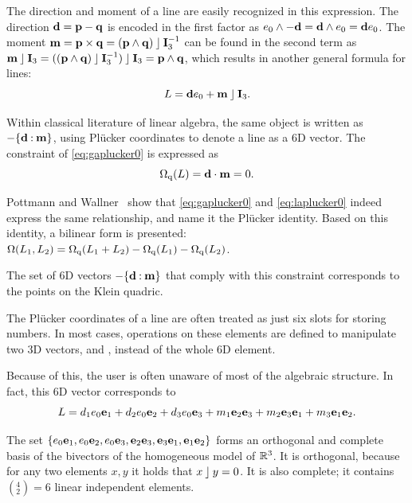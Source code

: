 The direction and moment of a line are easily recognized in this expression.  The direction $\mathbf{d} = \mathbf{p} - \mathbf{q}$ is encoded in the first factor as $e_0 \wedge -\mathbf{d} = \mathbf{d} \wedge e_0 = \mathbf{d} e_0$.  
The moment $\mathbf{m} = \mathbf{p} \times \mathbf{q} = (\mathbf{p} \wedge \mathbf{q}) \mathbin{\rfloor} \mathbf{I}_3^{-1}$ can be found in the second term as $\mathbf{m} \mathbin{\rfloor} \mathbf{I}_3 = ((\mathbf{p} \wedge \mathbf{q}) \mathbin{\rfloor} \mathbf{I}_3^{-1}) \mathbin{\rfloor} \mathbf{I}_3 = \mathbf{p} \wedge \mathbf{q}$, which results in another general formula for lines:
\begin{equation*}
  L = \mathbf{d} e_0 + \mathbf{m} \mathbin{\rfloor} \mathbf{I}_3.
\end{equation*}

Within classical literature of linear algebra, the same object is written as $-\{\mathbf{d} \mathbin{:} \mathbf{m}\}$, using Pl\"ucker coordinates to denote a line as a 6D vector.  The constraint of \autoref{eq:gaplucker0} is expressed as 
\begin{equation} \label{eq:laplucker0}
  \operatorname{\Omega_q}(L) = \mathbf{d} \mathbin{\cdot} \mathbf{m} = 0 .
\end{equation}

Pottmann and Wallner~\cite[Lemma 2.1.2]{Pottmann} show that \autoref{eq:gaplucker0} and \autoref{eq:laplucker0} indeed express the same relationship, and name it the Pl\"ucker identity.  Based on this identity, a bilinear form is presented: $\operatorname{\Omega}(L_1, L_2) = \operatorname{\Omega_q}(L_1 + L_2) - \operatorname{\Omega_q}(L_1) - \operatorname{\Omega_q}(L_2)$.  

The set of 6D vectors $-\{\mathbf{d} \mathbin{:} \mathbf{m}\}$ that comply with this constraint corresponds to the points on the Klein quadric.

The Pl\"ucker coordinates of a line are often treated as just six slots for storing numbers.  In most cases, operations on these elements are defined to manipulate two 3D vectors,  and , instead of the whole 6D element.  

Because of this, the user is often unaware of most of the algebraic structure.  In fact, this 6D vector corresponds to
\begin{equation*}
  L = d_1 e_0\mathbf{e}_1 + d_2 e_0\mathbf{e}_2 + d_3 e_0\mathbf{e}_3 + m_1 \mathbf{e}_2\mathbf{e}_3 + m_2 \mathbf{e}_3\mathbf{e}_1 + m_3 \mathbf{e}_1\mathbf{e}_2 .
\end{equation*}

The set $\{e_0\mathbf{e}_1, e_0\mathbf{e}_2, e_0\mathbf{e}_3, \mathbf{e}_2\mathbf{e}_3, \mathbf{e}_3\mathbf{e}_1, \mathbf{e}_1\mathbf{e}_2\}$ forms an orthogonal and complete basis of the bivectors of the homogeneous model of $\mathbb{R}^3$.  It is orthogonal, because for any two elements $x, y$ it holds that $x \mathbin{\rfloor} y = 0$. It is also complete; it contains $(^4_2) = 6$ linear independent elements.

